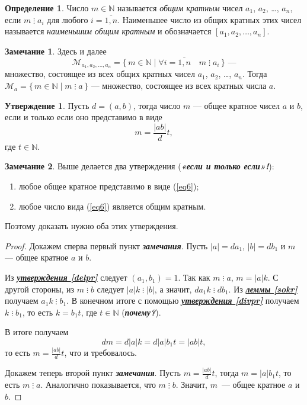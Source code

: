 \documentclass[14pt, a4paper]{extarticle}
\theoremstyle{definition}
\newtheorem*{definition}{Определение}
\newtheorem*{remark}{Замечание}
\newtheorem{statement}{Утверждение}
\newcommand{\divisible}{\mathop{\vdots}}
\begin{document}
	\begin{definition}
		Число $m\in\mathbb{N}$ называется \emph{общим кратным} чисел $a_1$, $a_2$, \dots, $a_n$, если $m\divisible a_i$ для любого $i=\overline{1,n}$. Наименьшее число из общих кратных этих чисел называется \emph{наименьшим общим кратным} и обозначается $[a_1, a_2, \dots, a_n]$.
	\end{definition}

	\begin{remark}
		Здесь и далее $$\mathcal{M}_{a_1, a_2, \dots, a_n}=\{\,m\in\mathbb{N}\mid\forall i=\overline{1,n}\quad m\divisible a_i\,\}\text{ ---}$$ множество, состоящее из всех общих кратных чисел $a_1$, $a_2$, \dots, $a_n$. Тогда $\mathcal{M}_a=\{\,m\in\mathbb{N}\mid m\divisible a\,\}$ --- множество, состоящее из всех кратных числа $a$.
	\end{remark}

	\begin{statement}
		Пусть $d=(a,b)$, тогда число $m$ --- общее кратное чисел $a$ и $b$, если и только если оно представимо в виде
		\begin{equation}
		\label{eq6}
			m=\frac{|ab|}{d}t,
		\end{equation}
		где $t\in\mathbb{N}$.
	\end{statement}
	\begin{remark}
		Выше делается два утверждения (\textbf{\textit{«если и только если»!}}):
		\begin{enumerate}[topsep=0pt,itemsep=-1ex,partopsep=1ex,parsep=1ex]
			\item любое общее кратное представимо в виде (\ref{eq6});
			\item любое число вида (\ref{eq6}) является общим кратным.
		\end{enumerate}
		Поэтому доказать нужно оба этих утверждения.
	\end{remark}
	\begin{proof}
		Докажем сперва первый пункт \textbf{\textit{замечания}}. Пусть $|a|=da_1$, $|b|=db_1$ и $m$ --- общее кратное $a$ и $b$.
		
		Из \hyperref[delpr]{\textbf{\textit{утверждения \ref*{delpr}}}} следует $(a_1,b_1)=1$. Так как $m\divisible a$, $m=|a|k$. С другой стороны, из $m\divisible b$ следует $|a|k\divisible|b|$, а значит, $da_1k\divisible db_1$. Из \hyperref[sokr]{\textbf{\textit{леммы \ref*{sokr}}}} получаем $a_1k\divisible b_1$. В конечном итоге с помощью \hyperref[divpr]{\textbf{\textit{утверждения \ref*{divpr}}}} получаем $k\divisible b_1$, то есть $k=b_1t$, где $t\in\mathbb{N}$ (\textbf{\textit{почему?}}).
		
		В итоге получаем $$dm=d|a|k=d|a|b_1t=|ab|t,$$ то есть $m=\frac{|ab|}{d}t$, что и требовалось.
		
		Докажем теперь второй пункт \textbf{\textit{замечания}}. Пусть $m=\frac{|ab|}{d}t$, тогда $m=|a|b_1t$, то есть $m\divisible a$. Аналогично показывается, что $m\divisible b$. Значит, $m$~--- общее кратное $a$ и $b$.
	\end{proof}
	
\end{document}
